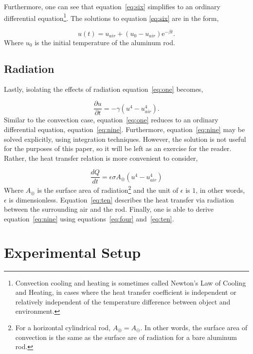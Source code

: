 \documentclass[10pt,aps,prb,twocolumn, nofootinbib]{revtex4-1}
\newcommand{\ut}{\ensuremath{\frac{\partial u}{\partial t}}}
\newcommand{\Qt}{\ensuremath{\frac{dQ}{dt}} }
\begin{document}
Furthermore, one can see that equation~\ref{eq:six} simplifies to an ordinary differential equation\footnote{Convection cooling and heating is sometimes called Newton's Law of Cooling and Heating, in cases where the heat transfer coefficient is independent or relatively independent of the temperature difference between object and environment.}. The solutions to equation \ref{eq:six} are in the form,

\begin{equation}
\label{eq:eight}
u(t) = u_{air} + (u_0 - u_{air})\mathrm{e}^{-\beta t}.
\end{equation}
Where $u_0$ is the initial temperature of the aluminum rod.


\subsection{\label{sec:oneRad}Radiation}
Lastly, isolating the effects of radiation equation~\ref{eq:one} becomes,

\begin{equation}
\label{eq:nine}
\ut = -\gamma(u^4 - u_{air}^4).
\end{equation}
Similar to the convection case, equation~\ref{eq:one} reduces to an ordinary differential equation, equation~\ref{eq:nine}. Furthermore, equation~\ref{eq:nine} may be solved explicitly, using integration techniques. However, the solution is not useful for the purposes of this paper, so it will be left as an exercise for the reader. Rather, the heat transfer relation is more convenient to consider,

\begin{equation}
\label{eq:ten}
\Qt = \epsilon \sigma A_{\circledcirc}(u^4 - u_{air}^4)
\end{equation}
Where $A_{\circledcirc}$ is the surface area of radiation\footnote{For a horizontal cylindrical rod, $A_{\circledcirc} = A_{\circleddash}.$ In other words, the surface area of convection is the same as the surface are of radiation for a bare aluminum rod.} and the unit of $\epsilon$ is $1$, in other words, $\epsilon$ is dimensionless. Equation~\ref{eq:ten} describes the heat transfer via radiation between the surrounding air and the rod. Finally, one is able to derive equation~\ref{eq:nine} using equations~\ref{eq:four} and~\ref{eq:ten}. 

\section{\label{sec:two} Experimental Setup}
\end{document}
